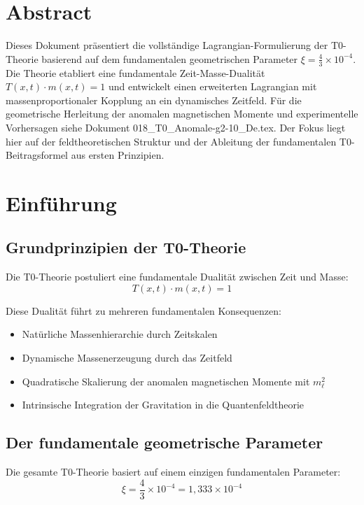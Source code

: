 \section*{Abstract}
		Dieses Dokument präsentiert die vollständige Lagrangian-Formulierung der T0-Theorie basierend auf dem fundamentalen geometrischen Parameter $\xi = \frac{4}{3} \times 10^{-4}$. Die Theorie etabliert eine fundamentale Zeit-Masse-Dualität $T(x,t) \cdot m(x,t) = 1$ und entwickelt einen erweiterten Lagrangian mit massenproportionaler Kopplung an ein dynamisches Zeitfeld. Für die geometrische Herleitung der anomalen magnetischen Momente und experimentelle Vorhersagen siehe Dokument 018\_T0\_Anomale-g2-10\_De.tex. Der Fokus liegt hier auf der feldtheoretischen Struktur und der Ableitung der fundamentalen T0-Beitragsformel aus ersten Prinzipien.

	
	
	\section{Einführung}
	
	\subsection{Grundprinzipien der T0-Theorie}
	
	Die T0-Theorie postuliert eine fundamentale Dualität zwischen Zeit und Masse:
	\begin{equation}
		T(x,t) \cdot m(x,t) = 1
		\label{eq:time_mass_duality}
	\end{equation}
	
	Diese Dualität führt zu mehreren fundamentalen Konsequenzen:
	\begin{itemize}
		\item Natürliche Massenhierarchie durch Zeitskalen
		\item Dynamische Massenerzeugung durch das Zeitfeld
		\item Quadratische Skalierung der anomalen magnetischen Momente mit $m_\ell^2$
		\item Intrinsische Integration der Gravitation in die Quantenfeldtheorie
	\end{itemize}
	
	\subsection{Der fundamentale geometrische Parameter}
	
	Die gesamte T0-Theorie basiert auf einem einzigen fundamentalen Parameter:
	\begin{equation}
		\boxed{\xi = \frac{4}{3} \times 10^{-4} = 1{,}333 \times 10^{-4}}
		\label{eq:xi_fundamental}
	\end{equation}
	
